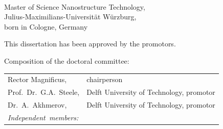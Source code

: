 \begin{titlepage}
\begin{center}
\bigskip
\bigskip

\makeatletter
{\Large\titlefont\bfseries\@firstname\ {\titleshape\@lastname}}
\makeatother

\bigskip
\bigskip

Master of Science Nanostructure Technology, \\
Julius-Maximilians-Universität Würzburg, \\
born in Cologne, Germany

\vspace*{2\bigskipamount}

\end{center}

\clearpage
\thispagestyle{empty}

\noindent This dissertation has been approved by the promotors.

\bigskip
\noindent Composition of the doctoral committee:

\medskip\noindent
\begin{tabular}{p{3.5cm}l}
    Rector Magnificus, & chairperson \\
    Prof.~Dr.~G.A.~Steele, & Delft University of Technology, promotor \\
    Dr.~A.~Akhmerov, & Delft University of Technology, promotor \\

    \medskip
    \mbox{\emph{Independent members:}} & \\






    
\end{tabular}


\end{titlepage}
